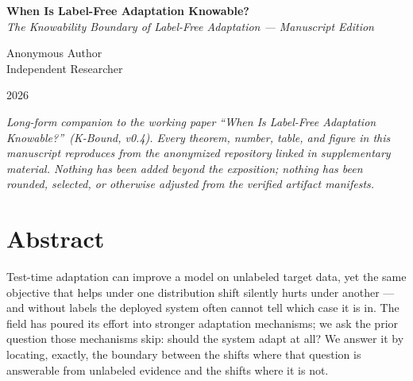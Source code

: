 
\begin{titlepage}
\centering
\vspace*{2.5cm}

{\Huge\bfseries When Is Label-Free Adaptation Knowable?}\\[1.2em]
{\large\itshape The Knowability Boundary of Label-Free Adaptation --- Manuscript Edition}

\vspace{2.5cm}

{\LARGE Anonymous Author}\\[0.6em]
{\large Independent Researcher}

\vspace{3cm}

{\large 2026}

\vspace{3.5cm}

\begin{minipage}{0.78\textwidth}
\small\itshape
Long-form companion to the working paper ``When Is Label-Free
Adaptation Knowable?''\ (K-Bound, v0.4).
Every theorem, number, table, and figure in this manuscript reproduces
from the anonymized repository linked in supplementary material.
Nothing has been added beyond the exposition; nothing has been rounded,
selected, or otherwise adjusted from the verified artifact manifests.
\end{minipage}

\vfill
\end{titlepage}

\chapter*{Abstract}

Test-time adaptation can improve a model on unlabeled target data, yet the same
objective that helps under one distribution shift silently hurts under another ---
and without labels the deployed system often cannot tell which case it is in. The
field has poured its effort into stronger adaptation mechanisms; we ask the prior
question those mechanisms skip: should the system adapt at all? We answer it by
locating, exactly, the boundary between the shifts where that question is
answerable from unlabeled evidence and the shifts where it is not.

